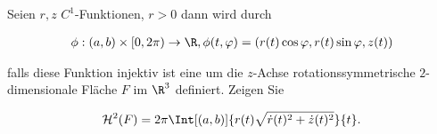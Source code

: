 
\begin{exercise}

Seien $r, z$ $C^1$-Funktionen, $r > 0$ dann wird durch

\begin{align*}
    \phi:
    (a, b) \times [0, 2 \pi) \to \R,
    \phi(t, \varphi) = (r(t) \cos \varphi, r(t) \sin \varphi, z(t))
\end{align*}

falls diese Funktion injektiv ist eine um die $z$-Achse rotationssymmetrische $2$-dimensionale Fläche $F$ im $\R^3$ definiert.
Zeigen Sie

\begin{align*}
    \mathcal{H}^2(F)
    =
    2 \pi
    \Int[(a, b)]{r(t) \sqrt{\dot r(t)^2 + \dot z(t)^2}}{t}.
\end{align*}

\end{exercise}


